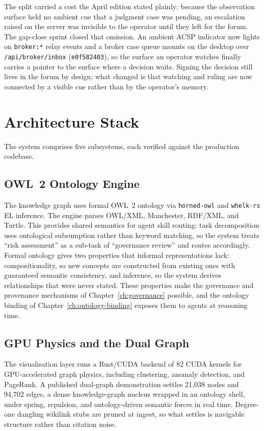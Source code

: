 The split carried a cost the April edition stated plainly: because the observation surface held no ambient cue that a judgment case was pending, an escalation raised on the server was invisible to the operator until they left for the forum. The gap-close sprint closed that omission. An ambient ACSP indicator now lights on \texttt{broker:*} relay events and a broker case queue mounts on the desktop over \texttt{/api/broker/inbox} (\texttt{e0f582403}), so the surface an operator watches finally carries a pointer to the surface where a decision waits. Signing the decision still lives in the forum by design; what changed is that watching and ruling are now connected by a visible cue rather than by the operator's memory.

\section{Architecture Stack}

The system comprises five subsystems, each verified against the production codebase.

\subsection{OWL~2 Ontology Engine}

The knowledge graph uses formal OWL~2 ontology via \texttt{horned-owl} and \texttt{whelk-rs} EL inference. The engine parses OWL/XML, Manchester, RDF/XML, and Turtle. This provides shared semantics for agent skill routing: task decomposition uses ontological subsumption rather than keyword matching, so the system treats ``risk assessment'' as a sub-task of ``governance review'' and routes accordingly. Formal ontology gives two properties that informal representations lack: compositionality, so new concepts are constructed from existing ones with guaranteed semantic consistency, and inference, so the system derives relationships that were never stated. These properties make the governance and provenance mechanisms of Chapter~\ref{ch:governance} possible, and the ontology binding of Chapter~\ref{ch:ontology-binding} exposes them to agents at reasoning time.

\subsection{GPU Physics and the Dual Graph}

The visualisation layer runs a Rust/CUDA backend of 82 CUDA kernels for GPU-accelerated graph physics, including clustering, anomaly detection, and PageRank. A published dual-graph demonstration settles 21,038 nodes and 94,702 edges, a dense knowledge-graph nucleus wrapped in an ontology shell, under spring, repulsion, and ontology-driven semantic forces in real time. Degree-one dangling wikilink stubs are pruned at ingest, so what settles is navigable structure rather than citation noise.

